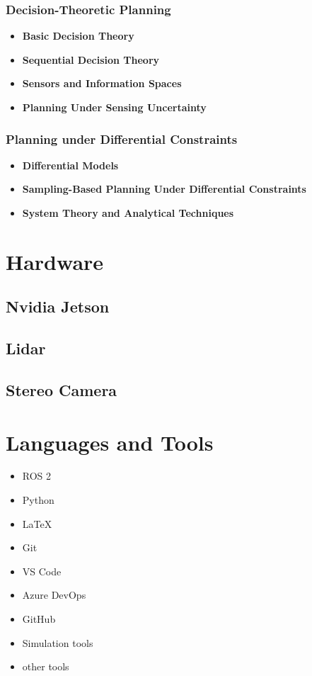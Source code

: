 \cite{planning_algorithms_steven_m_lavalle}

\subsubsection{Decision-Theoretic Planning}

\begin{itemize}
    \item \textbf{Basic Decision Theory}
    \item \textbf{Sequential Decision Theory}
    \item \textbf{Sensors and Information Spaces}
    \item \textbf{Planning Under Sensing Uncertainty}
\end{itemize}

\cite{planning_algorithms_steven_m_lavalle}

\subsubsection{Planning under Differential Constraints}

\begin{itemize}
    \item \textbf{Differential Models}
    \item \textbf{Sampling-Based Planning Under Differential Constraints}
    \item \textbf{System Theory and Analytical Techniques}
\end{itemize}

\cite{planning_algorithms_steven_m_lavalle}

\section{Hardware}

\subsection{Nvidia Jetson}
\lipsum[1]

\subsection{Lidar}
\lipsum[1]

\subsection{Stereo Camera}
\lipsum[1]

\section{Languages and Tools}

\begin{itemize}
    \item ROS 2
    \item Python
    \item LaTeX
    \item Git
    \item VS Code
    \item Azure DevOps
    \item GitHub
    \item Simulation tools
    \item other tools
\end{itemize}

\lipsum[1]